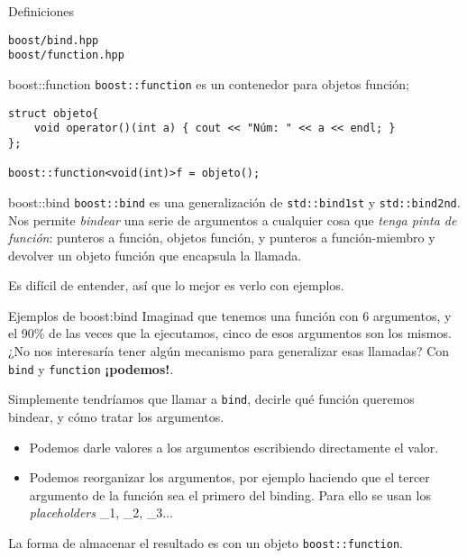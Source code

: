 \documentclass[8pt,xcolor=svgnames]{beamer}
\begin{document}
\begin{frame}[fragile]{Definiciones}
  \begin{block}{}
    \texttt{boost/bind.hpp}\\
    \texttt{boost/function.hpp}
    
  \end{block}

  \begin{block}{boost::function}
    \texttt{boost::function} es un contenedor para objetos función;
{\small
\begin{verbatim}
struct objeto{
    void operator()(int a) { cout << "Núm: " << a << endl; }
};

boost::function<void(int)>f = objeto();  
\end{verbatim}
}
  \end{block}

  \begin{block}{boost::bind}
    \texttt{boost::bind} es una generalización de
    \texttt{std::bind1st} y \texttt{std::bind2nd}. Nos permite
    \textit{bindear} una serie de argumentos a cualquier cosa que
    \textit{tenga pinta de función}: punteros a función, objetos
    función, y punteros a función-miembro y devolver un objeto función
    que encapsula la llamada.

    \bigskip

    Es difícil de entender, así que lo mejor es verlo con ejemplos.
  \end{block}
\end{frame}

\begin{frame}[fragile]{Ejemplos de boost:bind}
  Imaginad que tenemos una función con 6 argumentos, y el 90\% de las
  veces que la ejecutamos, cinco de esos argumentos son los
  mismos. ¿No nos interesaría tener algún mecanismo para generalizar
  esas llamadas? Con \texttt{bind} y \texttt{function} \textbf{¡podemos!}.

  Simplemente tendríamos que llamar a \texttt{bind}, decirle qué
  función queremos bindear, y cómo tratar los argumentos.
  \begin{itemize}
  \item Podemos darle valores a los argumentos escribiendo
    directamente el valor.
  \item Podemos reorganizar los argumentos, por ejemplo haciendo que
    el tercer argumento de la función sea el primero del binding. Para
    ello se usan los \textit{placeholders} \_1, \_2, \_3...
  \end{itemize}
  La forma de almacenar el resultado es con un objeto
  \texttt{boost::function}.
\end{frame}
\end{document}
